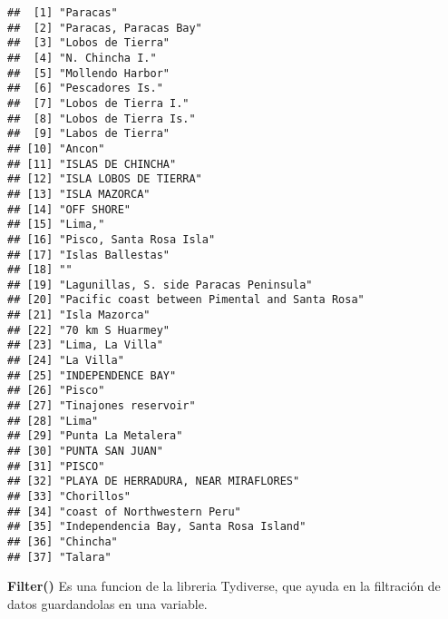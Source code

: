\documentclass[
]{article}
\newenvironment{Shaded}{\begin{snugshade}}{\end{snugshade}}
\newcommand{\FunctionTok}[1]{\textcolor[rgb]{0.13,0.29,0.53}{\textbf{#1}}}
\newcommand{\NormalTok}[1]{#1}
\newcommand{\OtherTok}[1]{\textcolor[rgb]{0.56,0.35,0.01}{#1}}
\newcommand{\SpecialCharTok}[1]{\textcolor[rgb]{0.81,0.36,0.00}{\textbf{#1}}}
\newcommand{\StringTok}[1]{\textcolor[rgb]{0.31,0.60,0.02}{#1}}
\begin{document}
\begin{verbatim}
##  [1] "Paracas"                                      
##  [2] "Paracas, Paracas Bay"                         
##  [3] "Lobos de Tierra"                              
##  [4] "N. Chincha I."                                
##  [5] "Mollendo Harbor"                              
##  [6] "Pescadores Is."                               
##  [7] "Lobos de Tierra I."                           
##  [8] "Lobos de Tierra Is."                          
##  [9] "Labos de Tierra"                              
## [10] "Ancon"                                        
## [11] "ISLAS DE CHINCHA"                             
## [12] "ISLA LOBOS DE TIERRA"                         
## [13] "ISLA MAZORCA"                                 
## [14] "OFF SHORE"                                    
## [15] "Lima,"                                        
## [16] "Pisco, Santa Rosa Isla"                       
## [17] "Islas Ballestas"                              
## [18] ""                                             
## [19] "Lagunillas, S. side Paracas Peninsula"        
## [20] "Pacific coast between Pimental and Santa Rosa"
## [21] "Isla Mazorca"                                 
## [22] "70 km S Huarmey"                              
## [23] "Lima, La Villa"                               
## [24] "La Villa"                                     
## [25] "INDEPENDENCE BAY"                             
## [26] "Pisco"                                        
## [27] "Tinajones reservoir"                          
## [28] "Lima"                                         
## [29] "Punta La Metalera"                            
## [30] "PUNTA SAN JUAN"                               
## [31] "PISCO"                                        
## [32] "PLAYA DE HERRADURA, NEAR MIRAFLORES"          
## [33] "Chorillos"                                    
## [34] "coast of Northwestern Peru"                   
## [35] "Independencia Bay, Santa Rosa Island"         
## [36] "Chincha"                                      
## [37] "Talara"
\end{verbatim}

\textbf{Filter()} Es una funcion de la libreria Tydiverse, que ayuda en
la filtración de datos guardandolas en una variable.

\begin{Shaded}
\end{Shaded}
\end{document}
